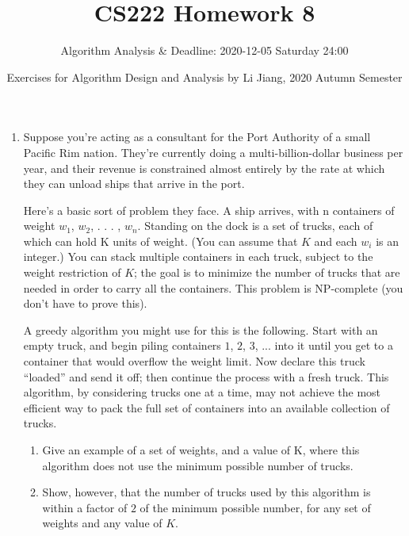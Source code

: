\documentclass{article}
\title{CS222 Homework 8}
\author{Algorithm Analysis \& Deadline: 2020-12-05 Saturday 24:00}
\date{Exercises for Algorithm Design and Analysis by Li Jiang, 2020 Autumn Semester}
\begin{document}
\maketitle

\begin{enumerate}


\item Suppose you’re acting as a consultant for the Port Authority of a small Pacific Rim nation. They’re currently doing a multi-billion-dollar business per year, and their revenue is constrained almost entirely by the rate at which they can unload ships that arrive in the port.

Here’s a basic sort of problem they face. A ship arrives, with n containers of weight $w_1$, $w_2$, . . . , $w_n$. Standing on the dock is a set of trucks, each of which can hold K units of weight. (You can assume that $K$ and each $w_i$ is an integer.) You can stack multiple containers in each truck, subject to the weight restriction of $K$; the goal is to minimize the number of trucks that are needed in order to carry all the containers. This problem is NP-complete (you don’t have to prove this).

A greedy algorithm you might use for this is the following. Start with an empty truck, and begin piling containers $1$, $2$, $3$, ... into it until you get to a container that would overflow the weight limit. Now declare this truck “loaded” and send it off; then continue the process with a fresh truck. This algorithm, by considering trucks one at a time, may not achieve the most efficient way to pack the full set of containers into an available collection of trucks.

\begin{enumerate}
    \item Give an example of a set of weights, and a value of K, where this algorithm does not use the minimum possible number of trucks.
    \item Show, however, that the number of trucks used by this algorithm is within a factor of $2$ of the minimum possible number, for any set of weights and any value of $K$.
\end{enumerate}




\end{enumerate}
\end{document}
